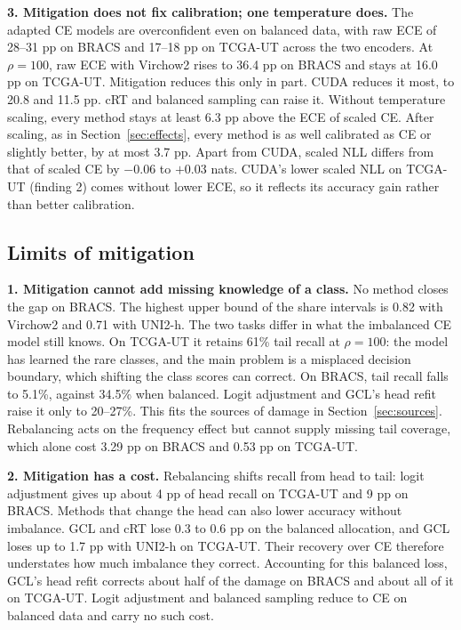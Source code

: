 \documentclass[11pt]{article}
\begin{document}
\smallskip\noindent\textbf{3. Mitigation does not fix calibration; one temperature does.}
The adapted CE models are overconfident even on balanced data, with raw ECE of 28--31 pp on BRACS and 17--18 pp on TCGA-UT across the two encoders. At $\rho=100$, raw ECE with Virchow2 rises to 36.4 pp on BRACS and stays at 16.0 pp on TCGA-UT. Mitigation reduces this only in part. CUDA reduces it most, to 20.8 and 11.5 pp. cRT and balanced sampling can raise it. Without temperature scaling, every method stays at least 6.3 pp above the ECE of scaled CE. After scaling, as in Section~\ref{sec:effects}, every method is as well calibrated as CE or slightly better, by at most 3.7 pp. Apart from CUDA, scaled NLL differs from that of scaled CE by $-0.06$ to $+0.03$ nats. CUDA's lower scaled NLL on TCGA-UT (finding 2) comes without lower ECE, so it reflects its accuracy gain rather than better calibration.

\subsection{Limits of mitigation}
\label{sec:limits}
\textbf{1. Mitigation cannot add missing knowledge of a class.}
No method closes the gap on BRACS. The highest upper bound of the share intervals is 0.82 with Virchow2 and 0.71 with UNI2-h. The two tasks differ in what the imbalanced CE model still knows. On TCGA-UT it retains 61\% tail recall at $\rho=100$: the model has learned the rare classes, and the main problem is a misplaced decision boundary, which shifting the class scores can correct. On BRACS, tail recall falls to 5.1\%, against 34.5\% when balanced. Logit adjustment and GCL's head refit raise it only to 20--27\%. This fits the sources of damage in Section~\ref{sec:sources}. Rebalancing acts on the frequency effect but cannot supply missing tail coverage, which alone cost 3.29 pp on BRACS and 0.53 pp on TCGA-UT.

\smallskip\noindent\textbf{2. Mitigation has a cost.}
Rebalancing shifts recall from head to tail: logit adjustment gives up about 4 pp of head recall on TCGA-UT and 9 pp on BRACS. Methods that change the head can also lower accuracy without imbalance. GCL and cRT lose 0.3 to 0.6 pp on the balanced allocation, and GCL loses up to 1.7 pp with UNI2-h on TCGA-UT. Their recovery over CE therefore understates how much imbalance they correct. Accounting for this balanced loss, GCL's head refit corrects about half of the damage on BRACS and about all of it on TCGA-UT. Logit adjustment and balanced sampling reduce to CE on balanced data and carry no such cost.
\end{document}
